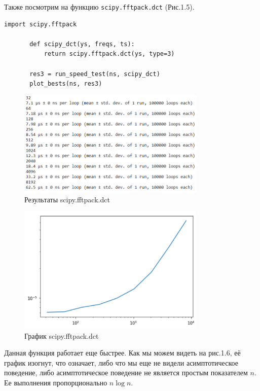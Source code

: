 \documentclass[a4paper,12pt]{report}
\begin{document}
    Также посмотрим на функцию \texttt{scipy.fftpack.dct} (Рис.1.5).
\begin{lstlisting}[caption=Получение результатов для scipy.fftpack.dct]
       import scipy.fftpack

       def scipy_dct(ys, freqs, ts):
           return scipy.fftpack.dct(ys, type=3)

       res3 = run_speed_test(ns, scipy_dct)
       plot_bests(ns, res3)
\end{lstlisting}
\begin{figure}[H]
        \centering
        \includegraphics[width=0.8\textwidth]{fig1-5.PNG}
        \caption{Результаты scipy.fftpack.dct}
        \label{fig:fig1-5}
\end{figure}  
\begin{figure}[H]
        \centering
        \includegraphics[width=0.8\textwidth]{fig1-6.PNG}
        \caption{График scipy.fftpack.dct}
        \label{fig:fig1-6}
\end{figure}     
     
     Данная функция работает еще быстрее. Как мы можем видеть на рис.1.6, её график изогнут, что означает, либо что мы еще не видели асимптотическое поведение, либо асимптотическое поведение не является простым показателем $n$. Ее выполнения пропорционально $n \log n$.
     
\end{document}
